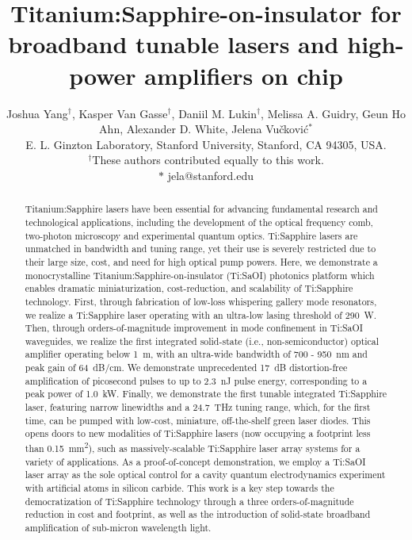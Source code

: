 \documentclass[amsmath, amsthm, amssymb, aps, prb, superscriptaddress, twocolumn, nofootinbib, 10pt]{revtex4-1}%
\begin{document}
\title{Titanium:Sapphire-on-insulator for broadband tunable lasers and high-power amplifiers on chip}
\author{Joshua Yang$^{\dagger}$, Kasper Van Gasse$^{\dagger}$, Daniil M. Lukin$^{ \dagger}$,  Melissa A. Guidry, Geun Ho Ahn, Alexander D. White,  Jelena Vu\v{c}kovi\'{c}$^{*}$\\
\vspace{+0.05 in}
E. L. Ginzton Laboratory, Stanford University, Stanford, CA 94305, USA.\\
{\small $^{\dagger}$These authors contributed equally to this work.}\\
{\small $*$ jela@stanford.edu}}

\begin{abstract}
\noindent 
Titanium:Sapphire lasers have been essential for advancing fundamental research and technological applications, including the development of the optical frequency comb\cite{holzwarth2000optical}, two-photon microscopy\cite{helmchen2005deep} and experimental quantum optics\cite{ semeghini2021probing, ebadi2021quantum}.
Ti:Sapphire lasers are unmatched in bandwidth and tuning range, yet their use is severely restricted due to their large size, cost, and need for high optical pump powers\cite{moulton1986spectroscopic}. 
Here, we demonstrate a monocrystalline Titanium:Sapphire-on-insulator (Ti:SaOI) photonics platform which enables dramatic miniaturization, cost-reduction, and scalability of Ti:Sapphire technology.
First, through fabrication of low-loss whispering gallery mode resonators, we realize a Ti:Sapphire laser operating with an ultra-low lasing threshold of 290~\textmu W. 
Then, through orders-of-magnitude improvement in mode confinement in Ti:SaOI waveguides, we realize the first integrated solid-state (i.e., non-semiconductor) optical amplifier operating below 1~\textmu m, with an ultra-wide bandwidth of 700 - 950~nm and peak gain of 64~dB/cm. We demonstrate unprecedented 17~dB distortion-free amplification of picosecond pulses to up to 2.3~nJ pulse energy, corresponding to a peak power of 1.0~kW. 
Finally, we demonstrate the first tunable integrated Ti:Sapphire laser, featuring narrow linewidths and a 24.7~THz tuning range, which, for the first time, can be pumped with low-cost, miniature, off-the-shelf green laser diodes. 
This opens doors to new modalities of Ti:Sapphire lasers (now occupying a footprint less than 0.15~mm\textsuperscript{2}), such as massively-scalable Ti:Sapphire laser array systems for a variety of applications. As a proof-of-concept demonstration, we employ a Ti:SaOI laser array as the sole optical control for a cavity quantum electrodynamics experiment with artificial atoms in silicon carbide\cite{lukin2023two}. 
This work is a key step towards the democratization of Ti:Sapphire technology through a three orders-of-magnitude reduction in cost and footprint, as well as the introduction of solid-state broadband amplification of sub-micron wavelength light.


\end{abstract}
\end{document}
